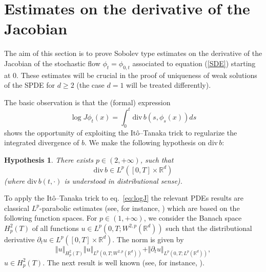 \documentclass[a4paper,11pt]{article}
\newtheorem{hypothesis}{Hypothesis}
\begin{document}
\section{Estimates on the derivative of the Jacobian}

\label{sec:jacobian} The aim of this section is to prove Sobolev
type
estimates on the derivative of the Jacobian of the stochastic flow %
$\phi _{t}=\phi _{0,t}$ associated to equation (\ref{SDE}) starting
at $0$. These estimates will be crucial in the proof of uniqueness
of weak solutions of the SPDE for $d\geq 2$
 (the case $d=1$ will be treated differently).

The basic observation is that the (formal) expression
\begin{equation}
\log J\phi _{t}(x)=\int_{0}^{t}\mathrm{div}\,b(s,\phi _{s}(x))ds
\label{eq:logJ}
\end{equation}
shows the opportunity of exploiting the It\^{o}--Tanaka trick to
regularize
the integrated divergence of $b$. We make the following hypothesis on $%
\mathrm{div}\,b$:

\begin{hypothesis}
\label{hy2} There exists $p \in (2,+\infty )$, such that
\begin{equation}
{\mathrm{div}\,}b\in L^{p} ([0,T]\times \mathbb{R}^{d}) \label{uni}
\end{equation}
(where ${\mathrm{div}\,}b(t,\cdot )$ is understood in distributional
sense).
\end{hypothesis}



 To apply the It\^{o}--Tanaka trick to eq.~\eqref{eq:logJ} the
 relevant PDEs  results are classical   $L^p$-parabolic
 estimates
 (see, for instance, \cite{Kr2})
  which are based on the following function spaces. For
$p \in (1,+\infty )$, we consider the Banach space $H_{p}^{2}(T)$ of
all functions $u\in
 L^{p}(0,T;W^{2,p}(\mathbb{R}%
^{d}))$ such that the distributional derivative $\partial _{t}u\in
L^{p} ([0,T]\times \mathbb{R}^{d})$. The norm is given by
\begin{equation*}
\Vert u\Vert _{{H_{p}^{2}(T)}} \Vert u\Vert _{L^{p}(0,T;W^{2,p}(\mathbb{R}%
^{d}))}+\Vert \partial _{t}u\Vert
_{L^{p}(0,T;L^{p}(\mathbb{R}^{d}))},
\end{equation*}
$u\in {H_{p}^{2}(T)}$.
 The next result is well known (see, for instance,  \cite[Theorem~9 in Section~7.3]{Kr2}).
\end{document}

